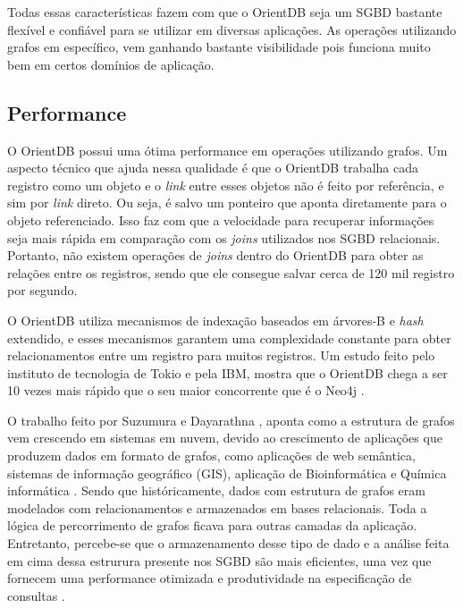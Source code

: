 	Todas essas características fazem com que o OrientDB seja um SGBD bastante flexível e confiável para se utilizar em diversas aplicações. As operações utilizando grafos em específico, vem ganhando bastante visibilidade pois funciona muito bem em certos domínios de aplicação.
	
\subsection{Performance} \label{orient_performance}
	O OrientDB possui uma ótima performance em operações utilizando grafos. Um aspecto técnico que ajuda nessa qualidade é que o OrientDB trabalha cada registro como um objeto e o \textit{link} entre esses objetos não é feito por referência, e sim por \textit{link} direto. Ou seja, é salvo um ponteiro que aponta diretamente para o objeto referenciado. Isso faz com que a velocidade para recuperar informações seja mais rápida em comparação com os \textit{joins} utilizados nos SGBD relacionais. Portanto, não existem operações de \textit{joins} dentro do OrientDB para obter as relações entre os registros, sendo que ele consegue salvar cerca de 120 mil registro por segundo.
	
	O OrientDB utiliza mecanismos de indexação baseados em árvores-B e \textit{hash} extendido, e esses mecanismos garantem uma complexidade constante para obter relacionamentos entre um registro para muitos registros. Um estudo feito pelo instituto de tecnologia de Tokio e pela IBM, mostra que o OrientDB chega a ser 10 vezes mais rápido que o seu maior concorrente que é o Neo4j \cite{dayarathna2012xgdbench}.
	
	O trabalho feito por Suzumura e Dayarathna \cite{dayarathna2012xgdbench}, aponta como a estrutura de grafos vem crescendo em sistemas em nuvem, devido ao crescimento de aplicações que produzem dados em formato de grafos, como aplicações de web semântica, sistemas de informação geográfico (GIS), aplicação de Bioinformática \cite{dudley2010translational} e Química informática \cite{ekins2010chemical}. Sendo que históricamente, dados com estrutura de grafos eram modelados com relacionamentos e armazenados em bases relacionais. Toda a lógica de percorrimento de grafos ficava para outras camadas da aplicação. Entretanto, percebe-se que o armazenamento desse tipo de dado e a análise feita em cima dessa estrurura presente nos SGBD são mais eficientes, uma vez que fornecem uma performance otimizada e produtividade na especificação de consultas \cite{dayarathna2012xgdbench}.
	

